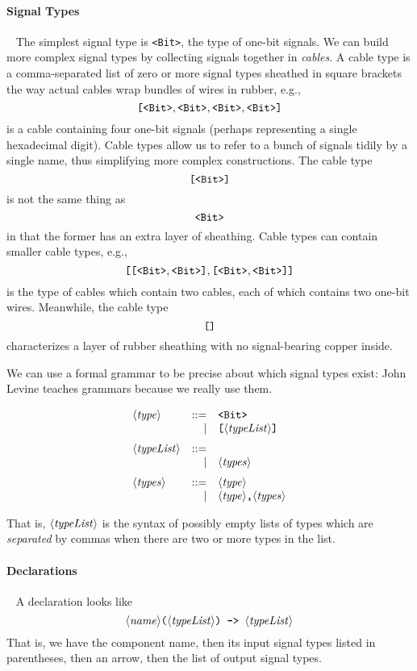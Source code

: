 \documentclass{article}
\begin{document}
\paragraph{Signal Types}~ The simplest signal type is \texttt{<Bit>},
the type of one-bit signals. We can build more complex signal types
by collecting signals together in \emph{cables}. A cable type is a
comma-separated list of zero or more signal types sheathed in square
brackets the way actual cables wrap bundles of wires in rubber, e.g.,
\[
  \texttt{[}\texttt{<Bit>},\texttt{<Bit>},\texttt{<Bit>},\texttt{<Bit>}\texttt{]}
\]
is a cable containing four one-bit signals (perhaps representing a
single hexadecimal digit). Cable types allow us to refer to a
bunch of signals tidily by a single name, thus simplifying more complex
constructions. The cable type
\[
  \texttt{[}\texttt{<Bit>}\texttt{]}
\]
is not the same thing as
\[
  \texttt{<Bit>}
\]
in that the former has an extra layer of sheathing. Cable types
can contain smaller cable types, e.g.,
\[
  \texttt{[}\texttt{[}\texttt{<Bit>},\texttt{<Bit>}\texttt{]},\texttt{[}\texttt{<Bit>},\texttt{<Bit>}\texttt{]}\texttt{]}
\]
is the type of cables which contain two cables, each of which contains
two one-bit wires. Meanwhile, the cable type
\[
  \texttt{[}\texttt{]}
\]
characterizes a layer of rubber sheathing with no signal-bearing
copper inside.

We can use a formal grammar to be precise about which signal types
exist: John Levine teaches grammars because we really use them.

\[\begin{array}{lrl}
    \NT{type} & ::= & \Bit \\
              &   | & \cab{\NT{typeList}} \medskip\\
    \NT{typeList} & ::= & \\
              &   | & \NT{types}  \medskip\\
    \NT{types} & ::= & \NT{type} \\
               &   | & \NT{type}\texttt{,}\NT{types}
\end{array} \]

That is, $\langle\mathit{typeList}\rangle$ is the syntax of possibly empty lists
of types which are \emph{separated} by commas when there are two
or more types in the list.

\paragraph{Declarations}~ A declaration looks like
\[
  \langle\mathit{name}\rangle\texttt{(}\langle\mathit{typeList}\rangle\texttt{)}\texttt{~->~}\langle\mathit{typeList}\rangle
\]
That is, we have the component name, then its input signal types
listed in parentheses, then an arrow, then the list of output
signal types.
\end{document}
